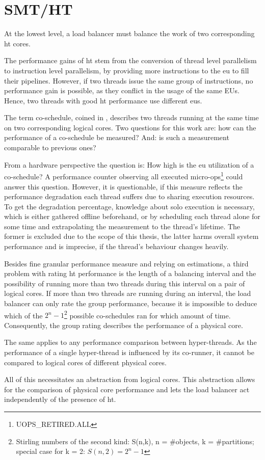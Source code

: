 \section{SMT/HT}
\label{design:smt}


At the lowest level, a load balancer must balance the work of two corresponding
\gls{ht} cores.

The performance gains of \gls{ht} stem from the conversion of thread level
parallelism to instruction level parallelism, by providing more instructions to
the \gls{eu} to fill their pipelines.
However, if two threads issue the same group of instructions, no performance gain is
possible, as they conflict in the usage of the same EUs.
Hence, two threads with good \gls{ht} performance use different \gls{eu}s.

The term co-schedule, coined in \cite{snavely_symbiotic_2000}, describes two
threads running at the same time on two corresponding logical cores.
Two questions for this work are: how can the performance of a co-schedule be
measured? And: is such a measurement comparable to previous ones?

From a hardware perspective the question is: How high is the \gls{eu}
utilization of a co-schedule?
A performance counter observing all executed
micro-ops\footnote{UOPS\_RETIRED.ALL} could answer this question.
However, it is questionable, if this measure reflects the performance
degradation each thread suffers due to sharing execution resources.
To get the degradation percentage, knowledge about solo execution is necessary,
which is either gathered offline beforehand, or by scheduling each thread alone
for some time and extrapolating the measurement to the thread's lifetime.
The former is excluded due to the scope of this thesis, the latter harms
overall system performance and is imprecise, if the thread's behaviour changes
heavily.

Besides fine granular performance measure and relying on estimations, a third
problem with rating \gls{ht} performance is the length of a balancing interval
and the possibility of running more than two threads during this interval on a
pair of logical cores.
If more than two threads are running during an interval, the load balancer can
only rate the group performance, because it is impossible to deduce which
of the
$2^n-1$\footnote{Stirling numbers of the second kind: S(n,k), n = \#objects, k =
\#partitions;\\special case for k = 2: $S(n,2) = 2^n-1$}
possible co-schedules ran for which amount of time.
Consequently, the group rating describes the performance of a physical core.

The same applies to any performance comparison between hyper-threads. As the
performance of a single hyper-thread is influenced by its co-runner, it cannot
be compared to logical cores of different physical cores.

All of this necessitates an abstraction from logical cores.
This abstraction allows for the comparison of physical core performance and
lets the load balancer act independently of the presence of \gls{ht}.
